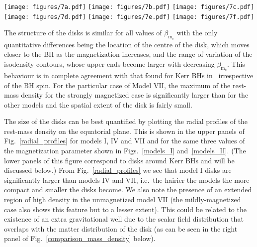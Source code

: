 \documentclass[twocolumn,aps,showpacs,showkeys,prd,superscriptaddress,byrevtex, amsmath]{revtex4-1}
\begin{document}
\begin{figure*}
\centering
\texttt{[image: figures/7a.pdf]}
\hspace{-0.3cm}
\texttt{[image: figures/7b.pdf]}
\hspace{-0.3cm}
\texttt{[image: figures/7c.pdf]}
\hspace{-0.2cm}
\\
\texttt{[image: figures/7d.pdf]}
\hspace{-0.3cm}
\texttt{[image: figures/7e.pdf]}
\hspace{-0.3cm}
\texttt{[image: figures/7f.pdf]}
\hspace{-0.2cm}
\caption{Energy density distribution for the torus $\rho_{\mathrm{T}}$ (upper half of the images) and for the scalar field $\rho_{\mathrm{SF}}$ (lower half). From left to right the columns correspond to models I, IV, and VII. The top row corresponds to non-magnetized models ($\beta_{\mathrm{m}_{\mathrm{c}}} = 10^{10}$) and the bottom row to strongly magnetized models ($\beta_{\mathrm{m}_{\mathrm{c}}} = 10^{-10}$).}
\label{comparison_mass_density}
\end{figure*}

The structure of the disks is similar for all values of $\beta_{\mathrm{m_c}}$ with the only quantitative differences being the location of the centre of the disk, which moves closer to the BH as the magnetization increases, and the range of variation of the isodensity contours, whose upper ends become larger with decreasing $\beta_{\mathrm{m_c}}$. This behaviour is in complete agreement with that found for Kerr BHs in~\cite{Gimeno-Soler:2017} irrespective of the BH spin. For the particular case of Model VII, the maximum of the rest-mass density for the strongly magnetized case is significantly larger than for the other models and the spatial extent of the disk is fairly small. 

The size of the disks can be best quantified by plotting the radial profiles of the rest-mass density on the equatorial plane. This is shown in the upper panels of Fig.~\ref{radial_profiles} for models I, IV and VII and for the same three values of the magnetization parameter shown in Figs.~\ref{models_I} and~\ref{models_II}. (The lower panels of this figure correspond to disks around Kerr BHs and will be discussed below.) From Fig.~\ref{radial_profiles} we see that model I disks are significantly larger than models IV and VII, i.e.~the hairier the models the more compact and smaller the disks become. We also note the presence of an extended region of high density in the unmagnetized model VII  (the mildly-magnetized case also shows this feature but to a lesser extent). This could be related to the existence of an extra gravitational well due to the scalar field distribution that overlaps with the matter distribution of the disk (as can be seen in the right panel of Fig.~\ref{comparison_mass_density} below).
\end{document}
